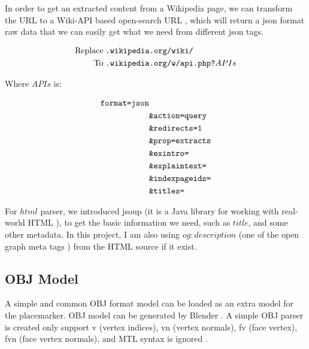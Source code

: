 In order to get an extracted content from a Wikipedia page, we can transform the URL to a Wiki-API based open-search URL \parencite{wiki.api.2016}, which will return a json format raw data that we can easily get what we need from different json tags.

\[
\begin{array}{lr}
\begin{aligned}
\text{Replace}\;&\texttt{.wikipedia.org/wiki/}\\
\text{To}\;&\texttt{.wikipedia.org/w/api.php?}APIs\\
\end{aligned}
\end{array}
\]

Where $APIs$ is:

\[
\begin{array}{lr}
\begin{aligned}
\texttt{format=json}&\\
&\texttt{\&action=query}\\
&\texttt{\&redirects=1}\\
&\texttt{\&prop=extracts}\\
&\texttt{\&exintro=}\\
&\texttt{\&explaintext=}\\
&\texttt{\&indexpageids=}\\
&\texttt{\&titles=}\\
\end{aligned}
\end{array}
\]

For $html$ parser, we introduced jsoup (it is a Java library for working with real-world HTML \parencite{joup.2016}), to get the basic information we need, such as $title$, and some other metadata. In this project, I am also using $og:description$ (one of the open graph meta tags \parencite{ogp.2014}) from the HTML source if it exist.

\subsection{OBJ Model}
\label{section:obj-model}

A simple and common OBJ format model can be loaded as an extra model for the placemarker. OBJ model can be generated by Blender \parencite{blender.2016}.  A simple OBJ parser is created only support v (vertex indices), vn (vertex normals), fv (face vertex), fvn (face vertex normals), and MTL syntax is ignored \parencite{hwshen.obj-parser.2011}.


